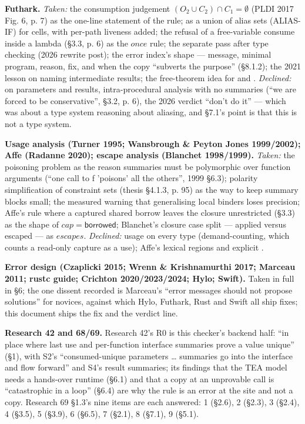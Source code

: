 \textbf{Futhark.} \emph{Taken:} the consumption judgement $(O_{2}\cup C_{2})\cap C_{1}=\emptyset$ (PLDI 2017 Fig. 6, p. 7) as the one-line statement of the rule;  as a union of alias sets (ALIAS-IF) for cells, with per-path liveness added; the refusal of a free-variable consume inside a lambda (§3.3, p. 6) as the $\mathit{once}$ rule; the separate pass after type checking (2026 rewrite post); the error index's shape — message, minimal program, reason,  fix, and when the copy “subverts the purpose” (§8.1.2); the 2021 lesson on naming intermediate results; the free-theorem idea for  and \code{|>}. \emph{Declined:} \code{*} on parameters and results, intra-procedural analysis with no summaries (“we are forced to be conservative”, §3.2, p. 6), the 2026 verdict “don't do it” — which was about a type system reasoning about aliasing, and §7.1's point is that this is not a type system.

\textbf{Usage analysis (Turner 1995; Wansbrough \& Peyton Jones 1999/2002); Affe (Radanne 2020); escape analysis (Blanchet 1998/1999).} \emph{Taken:} the poisoning problem as the reason summaries must be polymorphic over function arguments (“one call to f 'poisons' all the others”, 1999 §6.3); polarity simplification of constraint sets (thesis §4.1.3, p. 95) as the way to keep summary blocks small; the measured warning that generalising local binders loses precision; Affe's  rule where a captured shared borrow leaves the closure unrestricted (§3.3) as the shape of $\mathit{cap}=\mathsf{borrowed}$; Blanchet's closure case split — applied versus escaped — as $\mathit{escapes}$. \emph{Declined:} usage on every type (demand-counting, which counts a read-only capture as a use); Affe's lexical regions and explicit .

\textbf{Error design (Czaplicki 2015; Wrenn \& Krishnamurthi 2017; Marceau 2011; rustc guide; Crichton 2020/2023/2024; Hylo; Swift).} Taken in full in §6; the one dissent recorded is Marceau's “error messages should not propose solutions” for novices, against which Hylo, Futhark, Rust and Swift all ship fixes; this document ships the fix and the verdict line.

\textbf{Research 42 and 68/69.} Research 42's R0 is this checker's backend half: “in place where last use and per-function interface summaries prove a value unique” (§1), with S2's “consumed-unique parameters … summaries go into the interface and flow forward” and S4's result summaries; its findings that the TEA model needs a hands-over runtime (§6.1) and that a copy at an unprovable call is “catastrophic in a loop” (§6.4) are why the rule is an error at the site and not a copy. Research 69 §1.3's nine items are each answered: 1 (§2.6), 2 (§2.3), 3 (§2.4), 4 (§3.5), 5 (§3.9), 6 (§6.5), 7 (§2.1), 8 (§7.1), 9 (§5.1).
